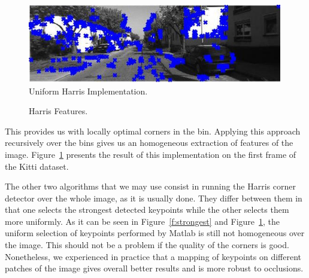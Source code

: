 \begin{figure}
  \includegraphics[width=0.99\textwidth]{files/custom_uniform_keypoints.jpg}
  \caption[\label{f:custom_uniform}Uniform Harris Implementation]{Uniform Harris Implementation.}
\end{figure}

\begin{figure}[b]
\caption[Harris Features]{\label{f:harris}Harris Features.}
\end{figure}

This provides us with locally optimal corners in
the bin. Applying this approach recursively over the bins gives us an homogeneous extraction of features of the image. Figure~\ref{f:custom_uniform} 
presents the result of this implementation on the first frame of the Kitti dataset.

The other two algorithms that we may use consist in running the Harris corner detector over the whole image, as it is usually done. They differ between them in that one selects the strongest detected keypoints while the other selects them more uniformly. As it can be seen in Figure~\ref{f:strongest} and Figure~\ref{f:custom_uniform}, the uniform selection of keypoints performed by Matlab is still not homogeneous over the image.
This should not be a problem if the quality of the corners is good. \\ Nonetheless, we experienced in practice that a mapping of keypoints on different
patches of the image gives overall better results and is more robust to occlusions.
